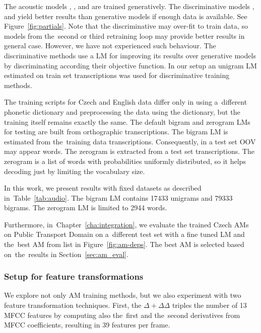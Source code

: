 The acoustic models , , 
and  are trained generatively.
The discriminative models ,  and  yield better results than generative models if enough data is available. 
See Figure~\ref{fig:partials}.
Note that the discriminative may over-fit to train data, so models from the~second or third retraining loop may provide better results in general case. 
However, we have not experienced such behaviour.
The discriminative methods use a \ac{LM} for improving its results over generative models by discriminating according their objective function.
In our setup an unigram \ac{LM} estimated on train set transcriptions was used for discriminative training methods.

The training scripts for Czech and English data differ only in using a~different phonetic dictionary and preprocessing the data using the dictionary, but the training itself remains exactly the same.
The default bigram and zerogram \acp{LM} for testing are built from orthographic transcriptions.
The bigram \ac{LM} is estimated from the~training data transcriptions. 
Consequently, in a test set \acl{OOV} may appear words.
The zerogram is extracted from a test set transcriptions.
The zerogram is a list of words with probabilities uniformly distributed, so it helps decoding just by limiting the vocabulary size.

In this work, we present results with fixed datasets as described in~Table~\ref{tab:audio}.
The bigram \ac{LM} contains 17433 unigrams and 79333 bigrams. The zerogram \ac{LM} is limited to 2944 words.

Furthermore, in~Chapter~\ref{cha:integration}, we evaluate the trained Czech \acp{AM} on Public Transport Domain on a~different test set with a fine tuned \ac{LM} and the~best \ac{AM} from list in Figure~\ref{fig:am-deps}.
The best \ac{AM} is selected based on~the~results in Section~\ref{sec:am_eval}.


\subsubsection*{Setup for feature transformations}
We explore not only \ac{AM} training methods, but we also experiment with two feature transformation techniques.
First, the $\Delta + \Delta\Delta$ triples the number of 13 \ac{MFCC} features by computing also the~first and the~second derivatives from \ac{MFCC} coefficients, resulting in 39 features per frame.

